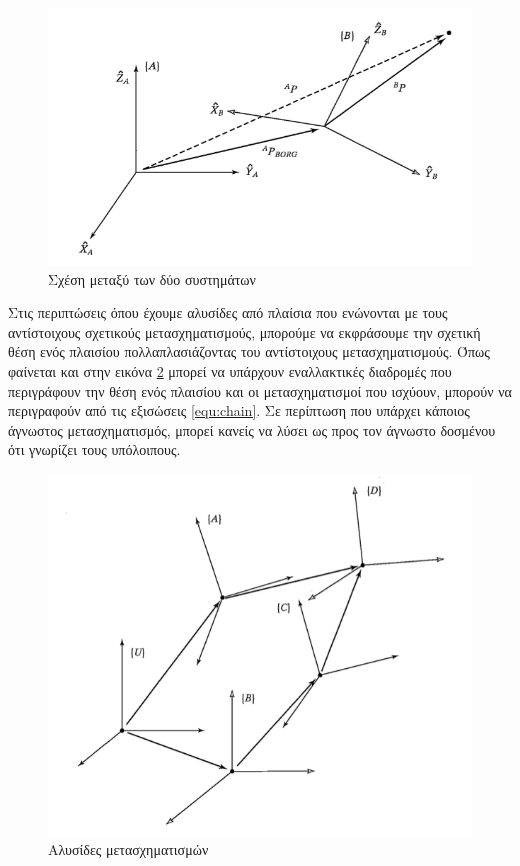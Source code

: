 \begin{figure}[H]
    \centering
    \includegraphics[width=.7\textwidth]{rigidbody/fig/transofrmation.png}
    \caption{Σχέση μεταξύ των δύο συστημάτων\cite{craig95}}
    \label{fig:transformation}
\end{figure}

Στις περιπτώσεις όπου έχουμε αλυσίδες από πλαίσια που ενώνονται με τους αντίστοιχους σχετικούς μετασχηματισμούς, μπορούμε να εκφράσουμε την σχετική θέση ενός πλαισίου πολλαπλασιάζοντας του αντίστοιχους μετασχηματισμούς. Όπως φαίνεται και στην εικόνα \ref{fig:transformation-chain} μπορεί να υπάρχουν εναλλακτικές διαδρομές που περιγράφουν την θέση ενός πλαισίου και οι μετασχηματισμοί που ισχύουν, μπορούν να περιγραφούν από τις εξισώσεις \ref{equ:chain}. Σε περίπτωση που υπάρχει κάποιος άγνωστος μετασχηματισμός, μπορεί κανείς να λύσει ως προς τον άγνωστο δοσμένου ότι γνωρίζει τους υπόλοιπους.

\begin{figure}[H]
    \centering
    \includegraphics[width=.7\textwidth, height=.4\textheight]{rigidbody/fig/transformation-chain.png}
    \caption{Αλυσίδες μετασχηματισμών\cite{craig95}}
    \label{fig:transformation-chain}
\end{figure}

